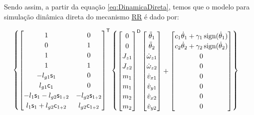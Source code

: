 \documentclass[a4paper,11pt,brazil,fleqn]{article}
\begin{document}
Sendo assim, a partir da equa\c{c}\~ao \eqref{eq:DinamicaDireta}, temos que o modelo para simula\c{c}\~ao din\^amica direta do mecanismo \underline{R}\underline{R} \'e dado por:

\small\begin{equation} \label{eq:RR}
\begin{cases}
\begin{bmatrix}
1 & 0 \\
0 & 1 \\
1 & 0 \\
1 & 1 \\
-l_{g1} \mathsf{s}_1 & 0 \\
 l_{g1} \mathsf{c}_1 & 0 \\
-l_{1} \mathsf{s}_1  - l_{g2} \mathsf{s}_{1{\scriptscriptstyle +} 2} & - l_{g2} \mathsf{s}_{1{\scriptscriptstyle +} 2} \\
 l_{1} \mathsf{s}_1  + l_{g2} \mathsf{c}_{1{\scriptscriptstyle +} 2} &   l_{g2} \mathsf{c}_{1{\scriptscriptstyle +} 2} \\
\end{bmatrix}^{\mathsf{T}}
\begin{Bmatrix}
\begin{bmatrix}
0 \\ 0 \\ J_{z1} \\ J_{z2} \\ m_1 \\ m_1 \\ m_2 \\ m_2
\end{bmatrix}^{\mathsf{D}}
\begin{bmatrix}
\ddot{\theta}_1 \\
\ddot{\theta}_2 \\
\dot{\omega}_{z1} \\
\dot{\omega}_{z2} \\
\dot{v}_{x1} \\
\dot{v}_{y1} \\
\dot{v}_{x2} \\
\dot{v}_{y2} \\
\end{bmatrix}
+
\begin{bmatrix}
c_1 \dot{\theta}_1 + \gamma_1 \operatorname*{sign} (\dot{\theta}_1) \\
c_2 \dot{\theta}_2 + \gamma_2 \operatorname*{sign} (\dot{\theta}_2) \\
0 \\
0 \\
0 \\
0 \\
0 \\
0 \\

\end{bmatrix}
\end{Bmatrix}
\end{cases}
\end{equation}
\end{document}

